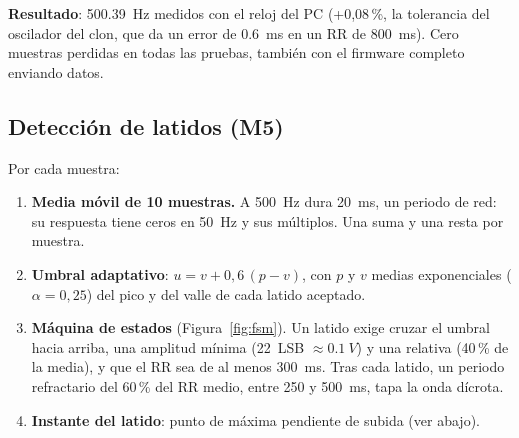 \documentclass[11pt,a4paper]{article}
\begin{document}
\textbf{Resultado}: \qty{500.39}{Hz} medidos con el reloj del PC (+0,08\,\%, la tolerancia
del oscilador del clon, que da un error de \qty{0.6}{ms} en un RR de \qty{800}{ms}). Cero
muestras perdidas en todas las pruebas, también con el firmware completo enviando datos.

\subsection{Detección de latidos (M5)}

Por cada muestra:
\begin{enumerate}[leftmargin=1.4em,itemsep=2pt,topsep=2pt]
  \item \textbf{Media móvil de 10 muestras.} A \qty{500}{Hz} dura \qty{20}{ms}, un periodo de
        red: su respuesta tiene ceros en \qty{50}{Hz} y sus múltiplos. Una suma y una resta
        por muestra.
  \item \textbf{Umbral adaptativo}: $u = v + 0{,}6\,(p - v)$, con $p$ y $v$ medias
        exponenciales ($\alpha = 0{,}25$) del pico y del valle de cada latido aceptado.
  \item \textbf{Máquina de estados} (Figura~\ref{fig:fsm}). Un latido exige cruzar el umbral
        hacia arriba, una amplitud mínima (\qty{22}{LSB} $\approx \qty{0.1}{V}$) y una relativa
        (40\,\% de la media), y que el RR sea de al menos \qty{300}{ms}. Tras cada latido, un
        periodo refractario del 60\,\% del RR medio, entre 250 y \qty{500}{ms}, tapa la onda
        dícrota.
  \item \textbf{Instante del latido}: punto de máxima pendiente de subida (ver abajo).
\end{enumerate}
\end{document}
